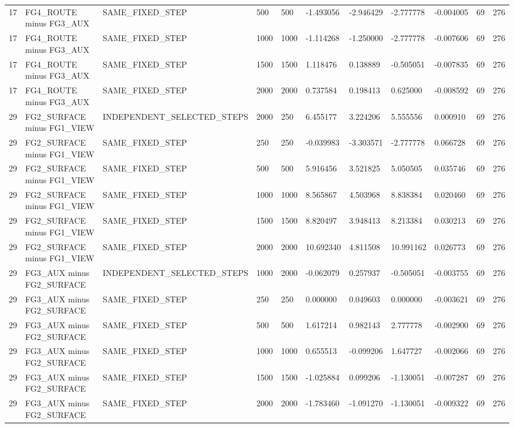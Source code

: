 \begin{tabular}{lllllllllll}
17 & FG4\_ROUTE minus FG3\_AUX & SAME\_FIXED\_STEP & 500 & 500 & -1.493056 & -2.946429 & -2.777778 & -0.004005 & 69 & 276 \\
17 & FG4\_ROUTE minus FG3\_AUX & SAME\_FIXED\_STEP & 1000 & 1000 & -1.114268 & -1.250000 & -2.777778 & -0.007606 & 69 & 276 \\
17 & FG4\_ROUTE minus FG3\_AUX & SAME\_FIXED\_STEP & 1500 & 1500 & 1.118476 & 0.138889 & -0.505051 & -0.007835 & 69 & 276 \\
17 & FG4\_ROUTE minus FG3\_AUX & SAME\_FIXED\_STEP & 2000 & 2000 & 0.737584 & 0.198413 & 0.625000 & -0.008592 & 69 & 276 \\
29 & FG2\_SURFACE minus FG1\_VIEW & INDEPENDENT\_SELECTED\_STEPS & 2000 & 250 & 6.455177 & 3.224206 & 5.555556 & 0.000910 & 69 & 276 \\
29 & FG2\_SURFACE minus FG1\_VIEW & SAME\_FIXED\_STEP & 250 & 250 & -0.039983 & -3.303571 & -2.777778 & 0.066728 & 69 & 276 \\
29 & FG2\_SURFACE minus FG1\_VIEW & SAME\_FIXED\_STEP & 500 & 500 & 5.916456 & 3.521825 & 5.050505 & 0.035746 & 69 & 276 \\
29 & FG2\_SURFACE minus FG1\_VIEW & SAME\_FIXED\_STEP & 1000 & 1000 & 8.565867 & 4.503968 & 8.838384 & 0.020460 & 69 & 276 \\
29 & FG2\_SURFACE minus FG1\_VIEW & SAME\_FIXED\_STEP & 1500 & 1500 & 8.820497 & 3.948413 & 8.213384 & 0.030213 & 69 & 276 \\
29 & FG2\_SURFACE minus FG1\_VIEW & SAME\_FIXED\_STEP & 2000 & 2000 & 10.692340 & 4.811508 & 10.991162 & 0.026773 & 69 & 276 \\
29 & FG3\_AUX minus FG2\_SURFACE & INDEPENDENT\_SELECTED\_STEPS & 1000 & 2000 & -0.062079 & 0.257937 & -0.505051 & -0.003755 & 69 & 276 \\
29 & FG3\_AUX minus FG2\_SURFACE & SAME\_FIXED\_STEP & 250 & 250 & 0.000000 & 0.049603 & 0.000000 & -0.003621 & 69 & 276 \\
29 & FG3\_AUX minus FG2\_SURFACE & SAME\_FIXED\_STEP & 500 & 500 & 1.617214 & 0.982143 & 2.777778 & -0.002900 & 69 & 276 \\
29 & FG3\_AUX minus FG2\_SURFACE & SAME\_FIXED\_STEP & 1000 & 1000 & 0.655513 & -0.099206 & 1.647727 & -0.002066 & 69 & 276 \\
29 & FG3\_AUX minus FG2\_SURFACE & SAME\_FIXED\_STEP & 1500 & 1500 & -1.025884 & 0.099206 & -1.130051 & -0.007287 & 69 & 276 \\
29 & FG3\_AUX minus FG2\_SURFACE & SAME\_FIXED\_STEP & 2000 & 2000 & -1.783460 & -1.091270 & -1.130051 & -0.009322 & 69 & 276 \\

\end{tabular}

